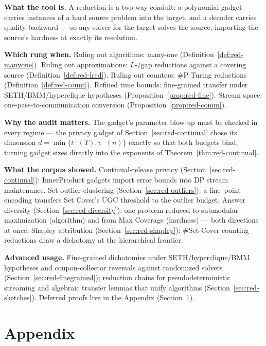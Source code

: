 \begin{recap}
\item \textbf{What the tool is.} A reduction is a two-way conduit: a polynomial gadget
  carries instances of a hard source problem into the target, and a decoder carries
  quality backward --- so any solver for the target solves the source, importing the
  source's hardness at exactly its resolution.
\item \textbf{Which rung when.} Ruling out algorithms: many-one (Definition~\ref{def:red-manyone}).
  Ruling out approximations: $L$-/gap reductions against a covering source
  (Definition~\ref{def:red-lred}). Ruling out counters: \#P Turing reductions
  (Definition~\ref{def:red-count}). Refined time bounds: fine-grained transfer under
  SETH/BMM/hyperclique hypotheses (Proposition~\ref{prop:red-fine}). Stream space:
  one-pass-to-communication conversion (Proposition~\ref{prop:red-comm}).
\item \textbf{Why the audit matters.} The gadget's parameter blow-up must be checked in
  every regime --- the privacy gadget of Section~\ref{sec:red-continual} chose its
  dimension $d = \min\{t^{-}(T), v^{-}(n)\}$ exactly so that both budgets bind, turning
  gadget sizes directly into the exponents of Theorem~\ref{thm:red-continual}.
\item \textbf{What the corpus showed.} Continual-release privacy
  (Section~\ref{sec:red-continual}): InnerProduct gadgets import error bounds into DP
  stream maintenance. Set-outlier clustering (Section~\ref{sec:red-outliers}): a
  line--point encoding transfers Set Cover's UGC threshold to the outlier budget.
  Answer diversity (Section~\ref{sec:red-diversity}): one problem reduced to submodular
  maximization (algorithm) and from Max Coverage (hardness) --- both directions at
  once. Shapley attribution (Section~\ref{sec:red-shapley}): \#Set-Cover counting
  reductions draw a dichotomy at the hierarchical frontier.
\item \textbf{Advanced usage.} Fine-grained dichotomies under SETH/hyperclique/BMM
  hypotheses and coupon-collector reversals against randomized solvers
  (Section~\ref{sec:red-finegrained}); reduction chains for pseudodeterministic
  streaming and algebraic transfer lemmas that unify algorithms
  (Section~\ref{sec:red-sketches}). Deferred proofs live in the
  Appendix (Section~\ref{sec:red-appendix}).
\end{recap}

\section{Appendix}
\label{sec:red-appendix}

